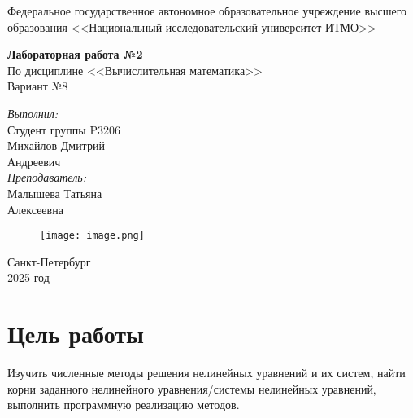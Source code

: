 \documentclass[12pt]{report}
\begin{document}
	
	\begin{titlepage}
		\begin{center}
			\large{Федеральное государственное автономное образовательное учреждение высшего образования <<Национальный исследовательский университет ИТМО>>}
		\end{center}
		
		\vspace{15em}
		
		\begin{center}
			\huge{\textbf{Лабораторная работа №2}} \\
			\large{По дисциплине <<Вычислительная математика>>} \\
			\large{Вариант №8}
		\end{center}
		
		\vspace{5em}
		
		\begin{flushright}
			\textit{\large{Выполнил:}} \\
			\large{Студент группы P3206} \\
			\large{Михайлов Дмитрий} \\
			\large{Андреевич} \\
			\textit{\large{Преподаватель:}} \\
			\large{Малышева Татьяна} \\
			\large{Алексеевна}
		\end{flushright}
		
		\vspace{2cm}
		
		\begin{figure}[h]
			\centering
			\texttt{[image: image.png]}
		\end{figure}
		
		\begin{center}
			Санкт-Петербург \\
			2025 год
		\end{center}
	\end{titlepage}
	
	\tableofcontents
	\newpage
	
	\section*{Цель работы}
	Изучить численные методы решения нелинейных уравнений и их
	систем, найти корни заданного нелинейного уравнения/системы нелинейных уравнений, выполнить программную реализацию методов.
	
\end{document}
